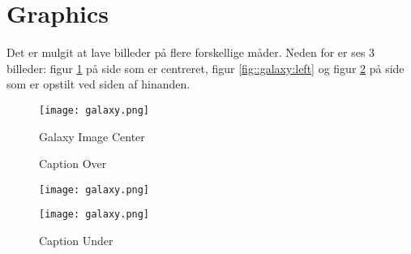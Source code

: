 \section{Graphics}
Det er mulgit at lave billeder på flere forskellige måder. Neden for er ses 3 billeder: figur \ref{fig::galaxy:top} på side \pageref{fig::galaxy:top} som er centreret, figur \ref{fig::galaxy:left} og figur \ref{fig::galaxy:right} på side \pageref{fig::galaxy:right} som er opstilt ved siden af hinanden.

\begin{figure}[ht]
    \centering
    \texttt{[image: galaxy.png]}
    \caption{Galaxy Image Center}
    \label{fig::galaxy:top}
\end{figure}

\begin{figure}[ht]
    \centering
    \begin{minipage}[b]{0.4\textwidth}
        \caption{Caption Over}
        \texttt{[image: galaxy.png]}
        \label{fig::galaxy:left}
    \end{minipage}
    \hfill
    \begin{minipage}[b]{0.4\textwidth}
        \texttt{[image: galaxy.png]}
        \caption{Caption Under}
        \label{fig::galaxy:right}
    \end{minipage}
\end{figure}